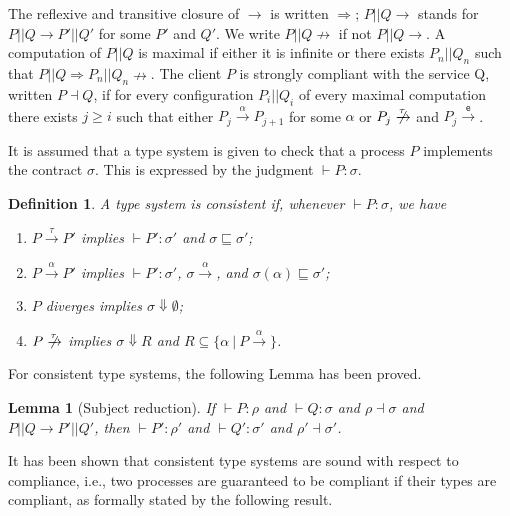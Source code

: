 \documentclass[submission,copyright,creativecommons]{eptcs}
\newcommand{\ppar}{|\!|}
\newtheorem{definition1}{Definition}
\newtheorem{lemma}{Lemma}
\begin{document}
The reflexive and transitive closure of $\rightarrow$ is written $\Rightarrow$;
$P\ppar Q \rightarrow$ stands for  $P\ppar Q \rightarrow P'\ppar Q'$ for some $P'$
and $Q'$. We write $P\ppar Q \nrightarrow$ if not $P\ppar Q \rightarrow$.
 A computation of $P\ppar Q$ is maximal if either it is infinite or there exists
$P_n\ppar Q_n$ such that $P\ppar Q \Rightarrow P_n\ppar Q_n \nrightarrow$.
The client $P$ is strongly compliant with the service Q, written $P\dashv Q$, 
if for every configuration $P_i\ppar Q_i$ of every maximal computation there 
exists $j \geq i$ such that either $P_j \xrightarrow{\alpha} P_{j+1}$ for some
$\alpha$ or $P_j \centernot{\xrightarrow{\tau}}$ and $P_j \xrightarrow{\mathtt{e}}$.

It is assumed that a type system is given to check that a process $P$ implements 
the contract $\sigma$. This is expressed by the judgment $\vdash P : \sigma$.

\begin{definition1} \label{def:consistency} 
A type system is \emph{consistent} if, whenever $\vdash P:\sigma$, we have

\begin{enumerate}
	\item $P\xrightarrow{\tau} P'$ implies $\vdash P':\sigma'$ and $\sigma \sqsubseteq \sigma'$;
	\item $P \xrightarrow{\alpha} P'$ implies $\vdash P':\sigma'$, $\sigma\xrightarrow{\alpha}$, and $\sigma(\alpha)\sqsubseteq \sigma'$;
	\item $P$ diverges implies $\sigma\Downarrow \emptyset$;
  \item $P\centernot{\xrightarrow{\tau}}$ implies $\sigma\Downarrow R$ and 
  $R \subseteq \{\alpha\ |\ P\xrightarrow{\alpha}\}$.
\end{enumerate}
\end{definition1}

For consistent type systems, the following Lemma has been proved.

\begin{lemma}[Subject reduction] \label{lemma:subjectreduction}
If $\vdash P: \rho$ and $\vdash Q:\sigma$ and $\rho\dashv \sigma$ and $P\ppar Q \xrightarrow {} P' \ppar Q'$, then $\vdash P': \rho'$ and $\vdash Q':\sigma'$ and $\rho'\dashv \sigma'$.
\end{lemma}

It has been shown that consistent type systems are sound with respect to compliance, i.e., two processes
are guaranteed to be compliant if their types are compliant, as formally stated by the following result.
\end{document}
